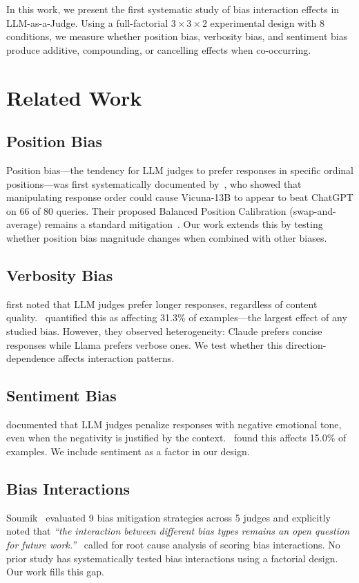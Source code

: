\documentclass[11pt,twocolumn]{article}
\begin{document}
In this work, we present the first systematic study of bias interaction effects in LLM-as-a-Judge. Using a full-factorial $3 \times 3 \times 2$ experimental design with 8 conditions, we measure whether position bias, verbosity bias, and sentiment bias produce additive, compounding, or cancelling effects when co-occurring.

\section{Related Work}
\label{sec:related}

\subsection{Position Bias}
Position bias---the tendency for LLM judges to prefer responses in specific ordinal positions---was first systematically documented by~\citet{wang2023large}, who showed that manipulating response order could cause Vicuna-13B to appear to beat ChatGPT on 66 of 80 queries. Their proposed Balanced Position Calibration (swap-and-average) remains a standard mitigation~\citep{shi2025judging}. Our work extends this by testing whether position bias magnitude changes when combined with other biases.

\subsection{Verbosity Bias}
\citet{zheng2023judging} first noted that LLM judges prefer longer responses, regardless of content quality.~\citet{yang2025reliable} quantified this as affecting 31.3\% of examples---the largest effect of any studied bias. However, they observed heterogeneity: Claude prefers concise responses while Llama prefers verbose ones. We test whether this direction-dependence affects interaction patterns.

\subsection{Sentiment Bias}
\citet{ye2024justice} documented that LLM judges penalize responses with negative emotional tone, even when the negativity is justified by the context.~\citet{yang2025reliable} found this affects 15.0\% of examples. We include sentiment as a factor in our design.

\subsection{Bias Interactions}
Soumik~\citep{soumik2026judging} evaluated 9 bias mitigation strategies across 5 judges and explicitly noted that \textit{``the interaction between different bias types remains an open question for future work.''}~\citet{li2025scoring} called for root cause analysis of scoring bias interactions. No prior study has systematically tested bias interactions using a factorial design. Our work fills this gap.
\end{document}
